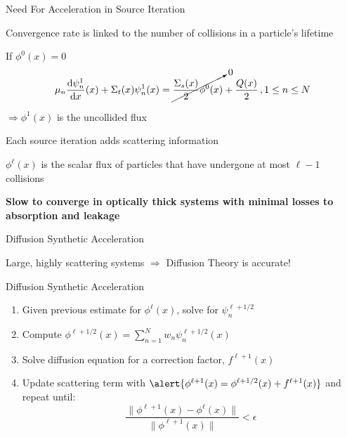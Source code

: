 \documentclass[10pt]{beamer}
\newcommand{\ud}{\mathop{}\!\mathrm{d}} %
\newcommand{\dderiv}[2]{\frac{\ud #1}{\ud #2}}
\begin{document}
\begin{frame}{Need For Acceleration in Source Iteration}

	Convergence rate is linked to the number of collisions in a particle's lifetime

    If $\phi^0(x) = 0$
    \begin{equation*}
        \mu_n \dderiv{\psi_n^{1}}{x}(x) + \Sigma_t(x) \psi_n^{1}(x) =
        \cancelto{0}{\frac{\Sigma_s(x)}{2} \phi^{0}(x)} + \frac{Q(x)}{2} \,, 1 \leq n \leq N 
    \end{equation*}      

    $\Rightarrow \phi^1(x) $ is the uncollided flux 

    Each source iteration adds scattering information 

    $\phi^{\ell}(x)$ is the scalar flux of particles that have undergone at most $\ell - 1$ collisions 

    \textbf{Slow to converge in optically thick systems with minimal losses to absorption and leakage}

\end{frame}

\begin{frame}{Diffusion Synthetic Acceleration}

    Large, highly scattering systems $\Rightarrow$ Diffusion Theory is accurate! 


    \begin{exampleblock}{Diffusion Synthetic Acceleration}
    \begin{enumerate}
        \item Given previous estimate for $\phi^{\ell}(x)$, solve for $\psi_n^{\ell+1/2}$

        \item Compute $\phi^{\ell+1/2}(x) = 
            \sum_{n=1}^N w_n \psi_n^{\ell+1/2}(x)$ 

        \item \alert{Solve diffusion equation for a correction factor, $f^{\ell+1}(x)$}

        \item Update scattering term with 
            $\alert{\phi^{\ell+1}(x) = \phi^{\ell+1/2}(x) + f^{\ell+1}(x)}$ 
        and repeat until: 
             \begin{equation*}
                \frac{\|\phi^{\ell+1}(x) - \phi^{\ell}(x)\|}{\|\phi^{\ell+1}(x)\|} < \epsilon 
             \end{equation*}

    \end{enumerate}
    \end{exampleblock}

\end{frame}
\end{document}
